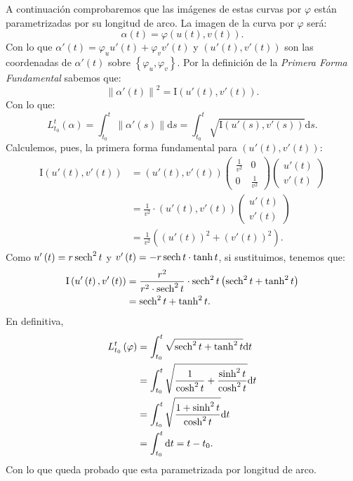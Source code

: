 A continuación comprobaremos que las imágenes de estas curvas por $\varphi$
están parametrizadas por su longitud de arco. La imagen de la curva por
$\varphi$ será:
\[
\alpha\left( t \right) = \varphi\left( u\left( t \right), v \left( t \right) \right).
\]
Con lo que $\alpha'\left( t \right) = \varphi_u u'\left( t \right) + \varphi_v
v'\left( t \right)$ y $\left( u'\left( t \right), v'\left( t \right) \right)$
son las coordenadas de $\alpha'\left( t \right)$ sobre $\left\{ \varphi_u,
\varphi_v \right\}$. Por la definición de la \textit{Primera Forma Fundamental}
sabemos que:
\[
\left\lVert \alpha'\left( t \right) \right\rVert^2 = \mathrm{I}
\left( u'\left( t \right), v'\left( t \right) \right).
\]
Con lo que:
\[
L_{t_0}^t \left( \alpha \right) = \int_{t_0}^{t} \left\lVert \alpha'\left( s
\right) \right\rVert \mathrm{d}s = \int_{t_0}^{t}
\sqrt{\mathrm{I} \left( u'\left( s \right), v'\left( s
\right) \right)} \mathrm{d}s.
\]
Calculemos, pues, la primera forma fundamental para $\left( u'\left( t \right),
v'\left( t \right) \right)$:
\begin{align*}
\mathrm{I} \left( u'\left( t \right), v'\left( t
\right) \right) &= \left( u'\left( t \right), v'\left( t \right) \right)
\begin{pmatrix} \frac{1}{v^2} & 0\\ 0 & \frac{1}{v^2} \end{pmatrix}
\begin{pmatrix} u'\left( t \right)\\ v'\left( t \right) \end{pmatrix}\\ 
&= \frac{1}{v^2} \cdot \left( u'\left( t \right), v'\left( t \right) \right) \begin{pmatrix} u'\left( t \right)\\ v'\left( t \right) \end{pmatrix}\\
&= \frac{1}{v^2} \left( \left( u'\left( t \right) \right)^2 + \left( v'\left( t
\right) \right)^2 \right).
\end{align*}
Como $u'\left( t \right) = r \operatorname{sech}^2 t$ y $v'\left( t \right) = -r \operatorname{sech} t
\cdot \tanh t$, si sustituimos, tenemos que:
\begin{align*}
\mathrm{I}\left( u'\left( t \right), v'\left( t
\right) \right) &= \frac{r^2}{r^2 \cdot \operatorname{sech}^2 t} \cdot \operatorname{sech}^2 t \left( \operatorname{sech}^2 t + \tanh^2 t
\right)\\
&= \operatorname{sech}^2 t + \tanh^2 t.
\end{align*}
En definitiva,
\begin{align*}
L_{t_0}^t \left( \varphi \right) &= \int_{t_0}^{t} \sqrt{\operatorname{sech}^2 t + \tanh^2
t} \mathrm{d}t\\
&= \int_{t_0}^{t} \sqrt{\frac{1}{\cosh^2 t} + \frac{\sinh^2 t}{\cosh^2 t}}
\mathrm{d}t\\
&= \int_{t_0}^{t} \sqrt{\frac{1 + \sinh^2 t}{\cosh^2 t}} \mathrm{d}t\\
&= \int_{t_0}^{t}  \mathrm{d}t= t - t_0.
\end{align*}
Con lo que queda probado que esta parametrizada por longitud de arco.

